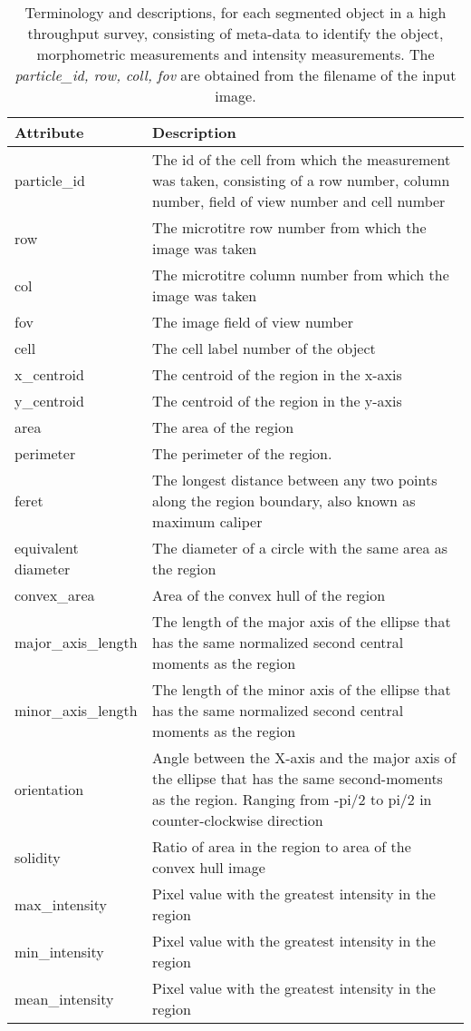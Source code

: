 \begin{table}[htbp]
\caption{Terminology and descriptions, for each segmented object in a high throughput survey, consisting of meta-data to identify the object, morphometric measurements and intensity measurements. The \emph{particle\_id, row, coll, fov} are obtained from the filename of the input image.}
\centering
\label{table:endothelial_morphometry:region_properties}
\begin{tabular}{l p{9cm}}
    \toprule
    Attribute  & Description \\
    \midrule
    particle\_id        & The id of the cell from which the measurement was taken, consisting of a row number, column number, field of view number and cell number \\
    row                 & The microtitre row number from which the image was taken \\
    col                 & The microtitre column number from which the image was taken \\
    fov                 & The image field of view number \\
    cell                & The cell label number of the object \\
    x\_centroid         & The centroid of the region in the x-axis \\
    y\_centroid         & The centroid of the region in the y-axis \\
    area                & The area of the region \\
    perimeter           & The perimeter of the region. \\
    feret               & The longest distance between any two points along the region boundary, also known as maximum caliper \\
    equivalent diameter & The diameter of a circle with the same area as the region \\
    convex\_area        & Area of the convex hull of the region \\
    major\_axis\_length & The length of the major axis of the ellipse that has the same normalized second central moments as the region \\
    minor\_axis\_length & The length of the minor axis of the ellipse that has the same normalized second central moments as the region \\
    orientation         & Angle between the X-axis and the major axis of the ellipse that has the same second-moments as the region. Ranging from -pi/2 to pi/2 in counter-clockwise direction \\
    solidity            & Ratio of area in the region to area of the convex hull image \\
    max\_intensity      & Pixel value with the greatest intensity in the region \\
    min\_intensity      & Pixel value with the greatest intensity in the region \\
    
    mean\_intensity     & Pixel value with the greatest intensity in the region \\
    \bottomrule
\end{tabular}
\end{table}

